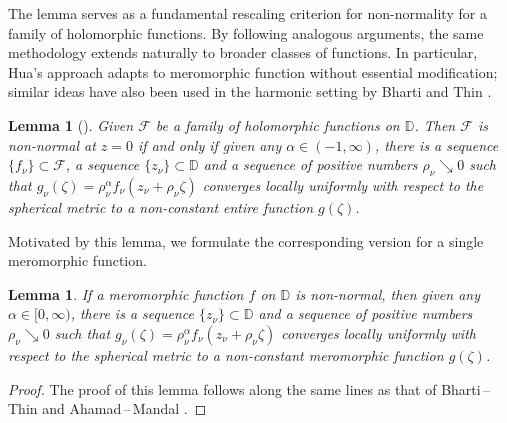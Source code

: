 \documentclass[10pt,a4paper]{amsart}
\newtheorem{lemma}[theorem]{Lemma}
\numberwithin{equation}{section}
\begin{document}
The lemma serves as a fundamental rescaling criterion for non-normality for a family of holomorphic 
functions. By following analogous arguments, the same methodology extends naturally to broader classes of functions. In particular, Hua’s \cite{hua-anatnc-1995} approach adapts to meromorphic function without 
essential modification; similar ideas have also been used in the harmonic setting by Bharti and Thin \cite{bharti-ronhapnhm-2025}.\smallskip
\begin{lemma}[{\cite[Lemma 6]{hua-anatnc-1995}}] \label{L-Hua} 
Given $\mathcal{F}$ be a family of holomorphic functions on $\mathbb D$. Then $\mathcal F$ is non-normal at $z=0$ if and only if given any 
$\alpha\in(-1,\infty)$, there is a sequence $\{f_{\nu}\}\subset\mathcal F$, a sequence $\{z_{\nu}\}\subset \mathbb D$ and a sequence of 
positive numbers $\rho_{\nu} \searrow 0$ such that $g_{\nu}(\zeta)=\rho_{\nu} ^{\alpha}f_{\nu}(z_{\nu}+\rho_{\nu} \zeta)$ converges locally 
uniformly with respect to the spherical metric to a non-constant entire function $g(\zeta)$.
\end{lemma}

Motivated by this lemma, we formulate the corresponding version for a single meromorphic function.  
\begin{lemma} \label{L-nnmf}
If a meromorphic function $f$ on $\mathbb D$ is non-normal, then given any $\alpha\in[0,\infty)$, there is a sequence $\{z_{\nu}\}\subset \mathbb D$ and a 
sequence of positive numbers $\rho_{\nu} \searrow 0$ such that $g_{\nu}(\zeta)=\rho_{\nu} ^{\alpha}f_{\nu}(z_{\nu}+\rho_{\nu} \zeta)$ converges locally 
uniformly with respect to the spherical metric to a non-constant meromorphic function $g(\zeta)$.
\end{lemma}
\begin{proof}
The proof of this lemma follows along the same lines as that of Bharti\,--\,Thin 
\cite[Theorem 1.2]{bharti-ronhapnhm-2025} and Ahamad\,--\,Mandal \cite[Theorem 2.2]{ahamed-ncflm-2025}.
\end{proof}

\end{document}
